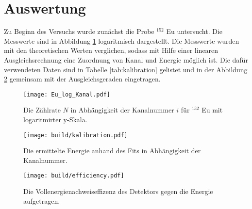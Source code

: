 \newpage
\section{Auswertung}
\label{sec:Auswertung}

Zu Beginn des Versuchs wurde zunächst die Probe ${}^{152}$ Eu untersucht. Die Messwerte
sind in Abbildung \ref{fig:Eu_log_Kanal} logaritmisch dargestellt. Die Messwerte
wurden mit den theoretischen Werten verglichen, sodass mit Hilfe einer linearen Ausgleichsrechnung
eine Zuordnung von Kanal und Energie möglich ist. Die dafür verwendeten Daten sind
in Tabelle \ref{tab:kalibration} gelistet und in der Abbildung \ref{fig:kalibration}
gemeinsam mit der Ausgleichsgeraden eingetragen.

\begin{figure}
 \centering
 \texttt{[image: Eu\_log\_Kanal.pdf]}
 \caption{Die Zählrate $N$ in Abhängigkeit der Kanalnummer $i$ für ${}^{152}$ Eu mit logaritmirter y-Skala.}
 \label{fig:Eu_log_Kanal}
\end{figure}

\begin{figure}
 \centering
 \texttt{[image: build/kalibration.pdf]}
 \caption{Die ermittelte Energie anhand des Fits in Abhängigkeit der Kanalnummer.}
 \label{fig:kalibration}
\end{figure}

\begin{figure}
 \centering
 \texttt{[image: build/efficiency.pdf]}
 \caption{Die Vollenergienachweiseffizenz des Detektors gegen die Energie aufgetragen.}
 \label{fig:effizenz}
\end{figure}







